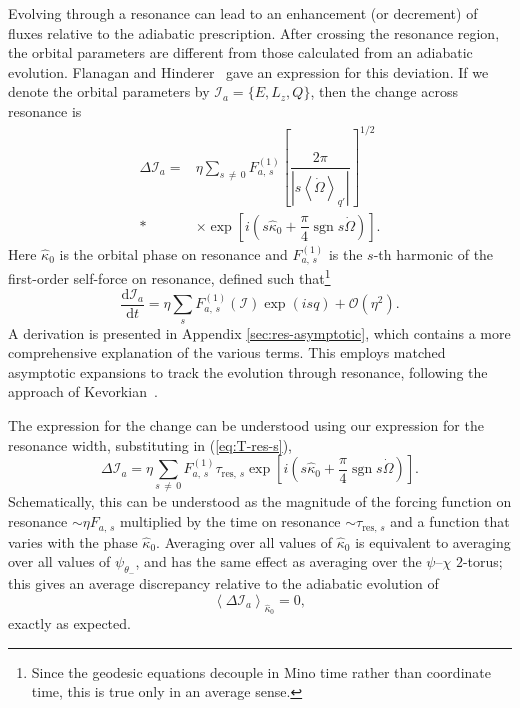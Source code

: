 \documentclass[aps,prd,amsfonts,amssymb,amsmath,nofootinbib,showpacs,superscriptaddress,twocolumn]{revtex4}
\newcommand{\eqnref}[1]{(\ref{eq:#1})}
\newcommand{\apref}[1]{Appendix \ref{sec:#1}}
\newcommand{\dd}{\ensuremath{\mathrm{d}}}
\newcommand{\diff}[2]{\ensuremath{\dfrac{\dd {#1}}{\dd {#2}}}}
\newcommand{\order}[1]{\ensuremath{\mathcal{O}({#1})}}
\DeclareMathOperator{\sgn}{sgn}
\begin{document}
Evolving through a resonance can lead to an enhancement (or decrement) of fluxes relative to the adiabatic prescription. After crossing the resonance region, the orbital parameters are different from those calculated from an adiabatic evolution. Flanagan and Hinderer~\cite{Flanagan2012} gave an expression for this deviation. If we denote the orbital parameters by $\mathcal{I}_a = \{E,L_z,Q\}$, then the change across resonance is
\begin{align}
\Delta \mathcal{I}_a = {} & \eta\sum_{s\,\neq\,0}F_{a,\,s}^{(1)}\left[\dfrac{2\pi}{\left|s \left\langle\dot{\Omega}\right\rangle_{q'}\right|}\right]^{1/2} \nonumber \\*
 {} & \times {} \exp\left[i\left(s \widehat{\kappa}_0 + \dfrac{\pi}{4} \sgn s\dot{\Omega}\right)\right]. 
\end{align}
Here $\widehat{\kappa}_0$ is the orbital phase on resonance and $F_{a,\,s}^{(1)}$ is the $s$-th harmonic of the first-order self-force on resonance, defined such that\footnote{Since the geodesic equations decouple in Mino time rather than coordinate time, this is true only in an average sense.}
\begin{equation}
\diff{\mathcal{I}_a}{t} = \eta\sum_s F_{a,\,s}^{(1)}(\boldsymbol{\mathcal{I}})\exp(is q) + \order{\eta^2}.
\end{equation}
A derivation is presented in \apref{res-asymptotic}, which contains a more comprehensive explanation of the various terms. This employs matched asymptotic expansions to track the evolution through resonance, following the approach of Kevorkian~\cite{Kevorkian1987}.

The expression for the change can be understood using our expression for the resonance width, substituting in \eqnref{T-res-s},
\begin{equation}
\label{eq:delta-I-a}
\Delta \mathcal{I}_a = \eta\sum_{s\,\neq\,0}F_{a,\,s}^{(1)}\tau_{\mathrm{res},\,s}\exp\left[i\left(s \widehat{\kappa}_0 + \dfrac{\pi}{4} \sgn s\dot{\Omega}\right)\right]. 
\end{equation}
Schematically, this can be understood as the magnitude of the forcing function on resonance $\sim \eta F_{a,\,s}$ multiplied by the time on resonance $\sim \tau_{\mathrm{res},\,s}$ and a function that varies with the phase $\widehat{\kappa}_0$. Averaging over all values of $\widehat{\kappa}_0$ is equivalent to averaging over all values of $\psi_{\theta_-}$, and has the same effect as averaging over the $\psi$--$\chi$ $2$-torus; this gives an average discrepancy relative to the adiabatic evolution of
\begin{equation}
\left\langle \Delta \mathcal{I}_a \right\rangle_{\hat{\kappa}_0} = 0,
\end{equation}
exactly as expected.
\end{document}
